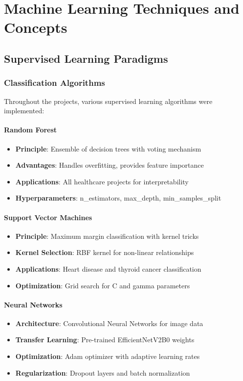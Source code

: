 \documentclass[12pt, a4paper]{article}
\begin{document}
\section{Machine Learning Techniques and Concepts}

\subsection{Supervised Learning Paradigms}

\subsubsection{Classification Algorithms}
Throughout the projects, various supervised learning algorithms were implemented:

\paragraph{Random Forest}
\begin{itemize}
    \item \textbf{Principle}: Ensemble of decision trees with voting mechanism
    \item \textbf{Advantages}: Handles overfitting, provides feature importance
    \item \textbf{Applications}: All healthcare projects for interpretability
    \item \textbf{Hyperparameters}: n\_estimators, max\_depth, min\_samples\_split
\end{itemize}

\paragraph{Support Vector Machines}
\begin{itemize}
    \item \textbf{Principle}: Maximum margin classification with kernel tricks
    \item \textbf{Kernel Selection}: RBF kernel for non-linear relationships
    \item \textbf{Applications}: Heart disease and thyroid cancer classification
    \item \textbf{Optimization}: Grid search for C and gamma parameters
\end{itemize}

\paragraph{Neural Networks}
\begin{itemize}
    \item \textbf{Architecture}: Convolutional Neural Networks for image data
    \item \textbf{Transfer Learning}: Pre-trained EfficientNetV2B0 weights
    \item \textbf{Optimization}: Adam optimizer with adaptive learning rates
    \item \textbf{Regularization}: Dropout layers and batch normalization
\end{itemize}
\end{document}
